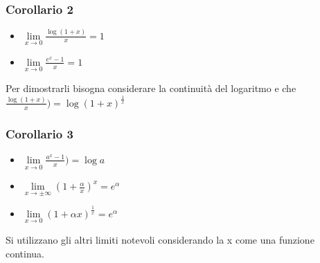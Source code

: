 \subsubsection{Corollario 2}
\begin{itemize}
\item $\lim\limits_{x\rightarrow 0} \frac{\log (1+x)}{x}=1$
\item $\lim\limits_{x\rightarrow 0} \frac{e^x-1}{x}=1$
\end{itemize}
Per dimostrarli bisogna considerare la continuit\`a del logaritmo e che $\frac{\log (1+x)}{x})=\log (1+x)^{\frac{1}{x}}$
\subsubsection{Corollario 3}
\begin{itemize}
\item $\lim\limits_{x\rightarrow 0} \frac{a^x-1}{x})=\log a$
\item $\lim\limits_{x\rightarrow\pm\infty} (1+\frac{\alpha}{x})^x=e^\alpha$
\item $\lim\limits_{x\rightarrow 0} (1+\alpha x)^\frac{1}{x}=e^\alpha$
\end{itemize}
Si utilizzano gli altri limiti notevoli considerando la x come una funzione continua.